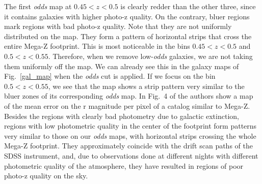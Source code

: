 The first \textit{odds} map at $0.45<z<0.5$ is clearly redder than the other three, since it contains galaxies with higher photo-z quality. On the contrary, bluer regions mark regions with bad photo-z quality. Note that they are not uniformly distributed on the map. They form a pattern of horizontal strips that cross the entire Mega-Z footprint. This is most noticeable in the bins $0.45<z<0.5$ and $0.5<z<0.55$. Therefore, when we remove low-\textit{odds} galaxies, we are not taking them uniformly off the map. We can already see this in the galaxy maps of Fig.~\ref{gal_map} when the {\it odds} cut is applied. If we focus on the bin $0.5<z<0.55$, we see that the map shows a strip pattern very similar to the bluer zones of its corresponding {\it odds} map. In Fig.~4 of \citet{Crocce2011} the authors show a map of the mean error on the r magnitude per pixel of a catalog similar to Mega-Z. Besides the regions with clearly bad photometry due to galactic extinction, regions with low photometric quality in the center of the footprint form patterns very similar to those on our \textit{odds} maps, with horizontal strips crossing the whole Mega-Z footprint. They approximately coincide with the drift scan paths of the SDSS instrument, and, due to observations done at different nights with different photometric quality of the atmosphere, they have resulted in regions of poor photo-z quality on the sky.
